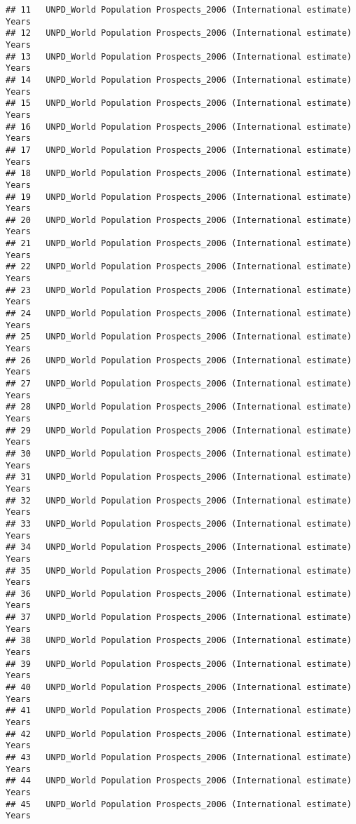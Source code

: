 \documentclass[]{article}
\begin{document}
\begin{verbatim}
## 11   UNPD_World Population Prospects_2006 (International estimate) Years
## 12   UNPD_World Population Prospects_2006 (International estimate) Years
## 13   UNPD_World Population Prospects_2006 (International estimate) Years
## 14   UNPD_World Population Prospects_2006 (International estimate) Years
## 15   UNPD_World Population Prospects_2006 (International estimate) Years
## 16   UNPD_World Population Prospects_2006 (International estimate) Years
## 17   UNPD_World Population Prospects_2006 (International estimate) Years
## 18   UNPD_World Population Prospects_2006 (International estimate) Years
## 19   UNPD_World Population Prospects_2006 (International estimate) Years
## 20   UNPD_World Population Prospects_2006 (International estimate) Years
## 21   UNPD_World Population Prospects_2006 (International estimate) Years
## 22   UNPD_World Population Prospects_2006 (International estimate) Years
## 23   UNPD_World Population Prospects_2006 (International estimate) Years
## 24   UNPD_World Population Prospects_2006 (International estimate) Years
## 25   UNPD_World Population Prospects_2006 (International estimate) Years
## 26   UNPD_World Population Prospects_2006 (International estimate) Years
## 27   UNPD_World Population Prospects_2006 (International estimate) Years
## 28   UNPD_World Population Prospects_2006 (International estimate) Years
## 29   UNPD_World Population Prospects_2006 (International estimate) Years
## 30   UNPD_World Population Prospects_2006 (International estimate) Years
## 31   UNPD_World Population Prospects_2006 (International estimate) Years
## 32   UNPD_World Population Prospects_2006 (International estimate) Years
## 33   UNPD_World Population Prospects_2006 (International estimate) Years
## 34   UNPD_World Population Prospects_2006 (International estimate) Years
## 35   UNPD_World Population Prospects_2006 (International estimate) Years
## 36   UNPD_World Population Prospects_2006 (International estimate) Years
## 37   UNPD_World Population Prospects_2006 (International estimate) Years
## 38   UNPD_World Population Prospects_2006 (International estimate) Years
## 39   UNPD_World Population Prospects_2006 (International estimate) Years
## 40   UNPD_World Population Prospects_2006 (International estimate) Years
## 41   UNPD_World Population Prospects_2006 (International estimate) Years
## 42   UNPD_World Population Prospects_2006 (International estimate) Years
## 43   UNPD_World Population Prospects_2006 (International estimate) Years
## 44   UNPD_World Population Prospects_2006 (International estimate) Years
## 45   UNPD_World Population Prospects_2006 (International estimate) Years

\end{verbatim}
\end{document}
